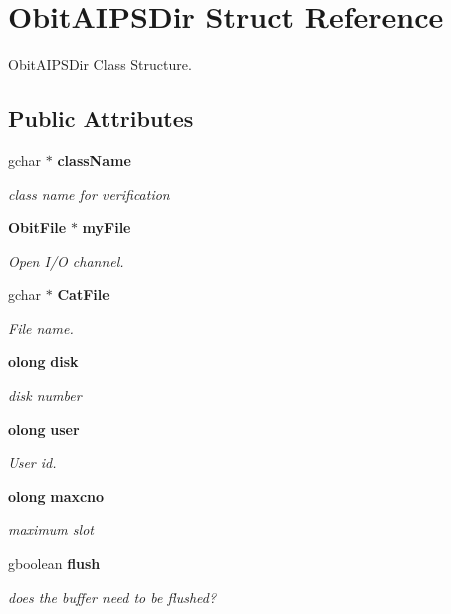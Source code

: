 \section{Obit\-AIPSDir Struct Reference}
\label{structObitAIPSDir}
Obit\-AIPSDir Class Structure.  


\subsection*{Public Attributes}
\begin{CompactItemize}
\item 
gchar $\ast$ {\bf class\-Name}
\begin{CompactList}\small\item\em class name for verification \item\end{CompactList}\item 
{\bf Obit\-File} $\ast$ {\bf my\-File}
\begin{CompactList}\small\item\em Open I/O channel. \item\end{CompactList}\item 
gchar $\ast$ {\bf Cat\-File}
\begin{CompactList}\small\item\em File name. \item\end{CompactList}\item 
{\bf olong} {\bf disk}
\begin{CompactList}\small\item\em disk number \item\end{CompactList}\item 
{\bf olong} {\bf user}
\begin{CompactList}\small\item\em User id. \item\end{CompactList}\item 
{\bf olong} {\bf maxcno}
\begin{CompactList}\small\item\em maximum slot \item\end{CompactList}\item 
gboolean {\bf flush}
\begin{CompactList}\small\item\em does the buffer need to be flushed? \item\end{CompactList}\end{CompactItemize}


